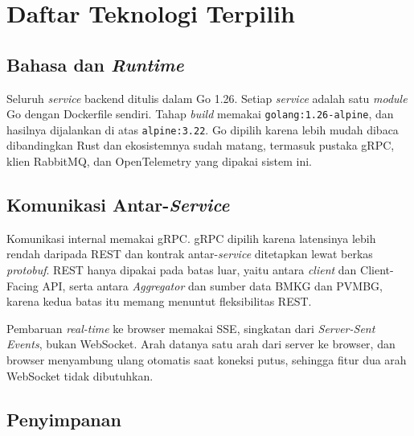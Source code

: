 \chapter{Daftar Teknologi Terpilih}

\section{Bahasa dan \textit{Runtime}}

Seluruh \textit{service} backend ditulis dalam Go 1.26. Setiap \textit{service} adalah satu \textit{module} Go dengan Dockerfile sendiri. Tahap \textit{build} memakai \texttt{golang:1.26-alpine}, dan hasilnya dijalankan di atas \texttt{alpine:3.22}. Go dipilih karena lebih mudah dibaca dibandingkan Rust dan ekosistemnya sudah matang, termasuk pustaka gRPC, klien RabbitMQ, dan OpenTelemetry yang dipakai sistem ini.

\section{Komunikasi Antar-\textit{Service}}

Komunikasi internal memakai gRPC. gRPC dipilih karena latensinya lebih rendah daripada REST dan kontrak antar-\textit{service} ditetapkan lewat berkas \textit{protobuf}. REST hanya dipakai pada batas luar, yaitu antara \textit{client} dan Client-Facing API, serta antara \textit{Aggregator} dan sumber data BMKG dan PVMBG, karena kedua batas itu memang menuntut fleksibilitas REST.

Pembaruan \textit{real-time} ke browser memakai SSE, singkatan dari \textit{Server-Sent Events}, bukan WebSocket. Arah datanya satu arah dari server ke browser, dan browser menyambung ulang otomatis saat koneksi putus, sehingga fitur dua arah WebSocket tidak dibutuhkan.

\section{Penyimpanan}

